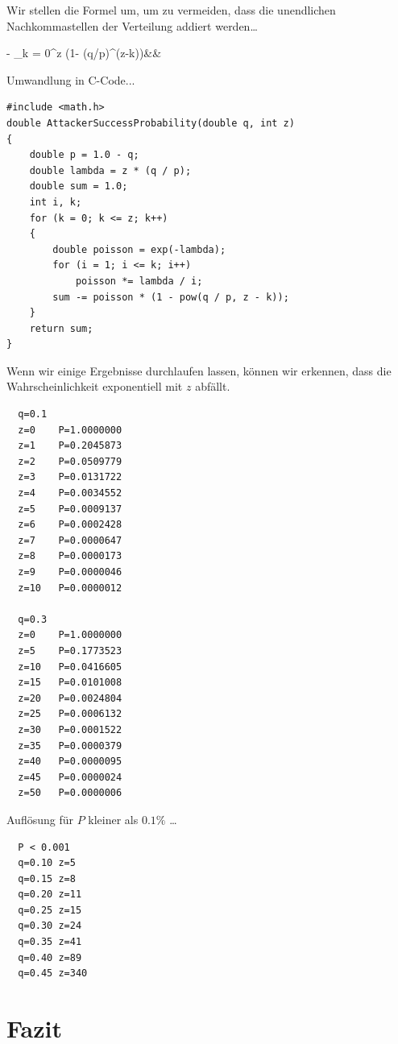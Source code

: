 \documentclass[9pt]{article}
\begin{document}
	\noindent Wir stellen die Formel um, um zu vermeiden, dass die unendlichen Nachkommastellen der Verteilung addiert werden…
	
	\begin{flalign*}
 - \sum_{k = 0}^{z}  (1- (q/p)^{(z-k)})&&
	\end{flalign*}
	\vspace{2mm}
	
	\noindent Umwandlung in C-Code...
	
	\begin{verbatim}
#include <math.h>
double AttackerSuccessProbability(double q, int z)
{
    double p = 1.0 - q;
    double lambda = z * (q / p);
    double sum = 1.0;
    int i, k;
    for (k = 0; k <= z; k++)
    {
        double poisson = exp(-lambda);
        for (i = 1; i <= k; i++)
            poisson *= lambda / i;
        sum -= poisson * (1 - pow(q / p, z - k));
    }
    return sum;
}
	\end{verbatim}
	
	\newpage
	
	\noindent Wenn wir einige Ergebnisse durchlaufen lassen, können wir erkennen, dass die Wahrscheinlichkeit exponentiell mit $z$ abfällt.
	
	\begin{verbatim}
  q=0.1
  z=0    P=1.0000000
  z=1    P=0.2045873
  z=2    P=0.0509779
  z=3    P=0.0131722
  z=4    P=0.0034552
  z=5    P=0.0009137
  z=6    P=0.0002428
  z=7    P=0.0000647
  z=8    P=0.0000173
  z=9    P=0.0000046
  z=10   P=0.0000012

  q=0.3
  z=0    P=1.0000000
  z=5    P=0.1773523
  z=10   P=0.0416605
  z=15   P=0.0101008
  z=20   P=0.0024804
  z=25   P=0.0006132
  z=30   P=0.0001522
  z=35   P=0.0000379
  z=40   P=0.0000095
  z=45   P=0.0000024
  z=50   P=0.0000006
	\end{verbatim}
	
	\noindent Auflösung für $P$ kleiner als $0.1\%$ …
	
	\begin{verbatim}
  P < 0.001
  q=0.10 z=5
  q=0.15 z=8
  q=0.20 z=11
  q=0.25 z=15
  q=0.30 z=24
  q=0.35 z=41
  q=0.40 z=89
  q=0.45 z=340
	\end{verbatim}
	
	\section{Fazit}
	
\end{document}
